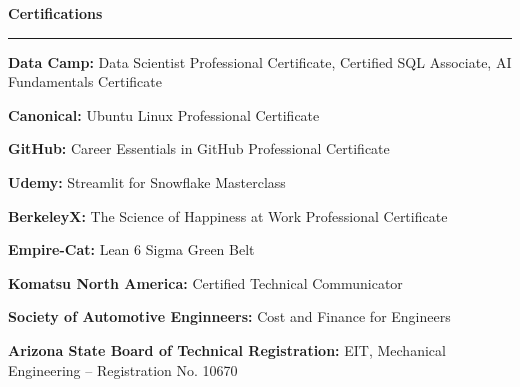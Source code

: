 \documentclass[11pt, letterpaper, sans]{article}
\newcommand{\sectionheader}[1]{%
  \vspace{11pt}%
  \par\noindent\textbf{\Large #1}\par\hrule\vspace{5pt}%
}
\begin{document}
\sectionheader{Certifications}

\par\noindent\textbf{Data Camp:} Data Scientist Professional Certificate, Certified SQL Associate, AI Fundamentals Certificate
\par\noindent\textbf{Canonical:} Ubuntu Linux Professional Certificate
\par\noindent\textbf{GitHub:} Career Essentials in GitHub Professional Certificate
\par\noindent\textbf{Udemy:} Streamlit for Snowflake Masterclass 
\par\noindent\textbf{BerkeleyX:} The Science of Happiness at Work Professional Certificate
\par\noindent\textbf{Empire-Cat:} Lean 6 Sigma Green Belt
\par\noindent\textbf{Komatsu North America:} Certified Technical Communicator
\par\noindent\textbf{Society of Automotive Enginneers:} Cost and Finance for Engineers
\par\noindent\textbf{Arizona State Board of Technical Registration:} EIT, Mechanical Engineering -- Registration No. 10670
\end{document}
